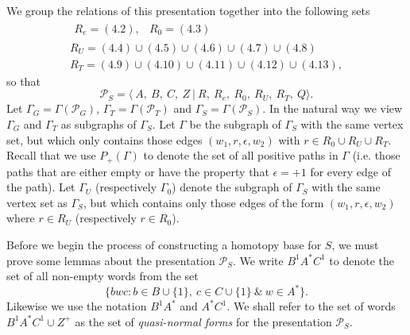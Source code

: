 \documentclass[11pt]{amsart}
\theoremstyle{plain}
\begin{document}
We group the relations of this presentation together into the following sets
\[
\begin{array}{c}
    \begin{array}{cc}
    R_e  =  (4.2), & R_0  =  (4.3)
    \end{array} \\
R_U =  (4.4) \cup (4.5) \cup (4.6) \cup (4.7) \cup (4.8) \\
R_T =  (4.9) \cup (4.10) \cup (4.11) \cup (4.12) \cup (4.13),
\end{array}
\]
so that
\[
\mathcal{P}_S = \langle \ A, \ B, \ C, \ Z \ |  \ R, \ R_e, \ R_0, \ R_U, \ R_T, \ Q \rangle.
\]
Let $\Gamma_G = \Gamma(\mathcal{P}_G)$, $\Gamma_T = \Gamma(\mathcal{P}_T)$ and $\Gamma_S = \Gamma(\mathcal{P}_S)$. In the natural way we view $\Gamma_G$ and $\Gamma_T$ as subgraphs of $\Gamma_S$. Let $\Gamma$ be the subgraph of $\Gamma_S$ with the same vertex set, but which only contains those edges $(w_1, r, \epsilon, w_2)$ with $r \in R_0 \cup R_U \cup R_T$. Recall that we use $P_+(\Gamma)$ to denote the set of all positive paths in $\Gamma$ (i.e. those paths that are either empty or have the property that $\epsilon = +1$ for every edge of the path). Let $\Gamma_U$ (respectively $\Gamma_0$) denote the subgraph of $\Gamma_S$ with the same vertex set as $\Gamma_S$, but which contains only those edges of the form $(w_1, r, \epsilon, w_2)$ where $r \in R_U$ (respectively $r \in R_0$).

Before we begin the process of constructing a homotopy base for $S$, we must prove some lemmas about the presentation $\mathcal{P}_S$. We write $B^1 A^* C^1$ to denote the set of all non-empty words from the set
\[
\{ bwc : b \in B \cup \{ 1 \}, \ c \in C \cup \{ 1 \} \ \& \ w \in A^*  \}.
\]
Likewise we use the notation $B^1 A^*$ and $A^* C^1$. We shall refer to the set of words $B^1 A^* C^1 \cup Z^+$ as the set of \emph{quasi-normal forms} for the presentation $\mathcal{P}_S$. 
\end{document}
